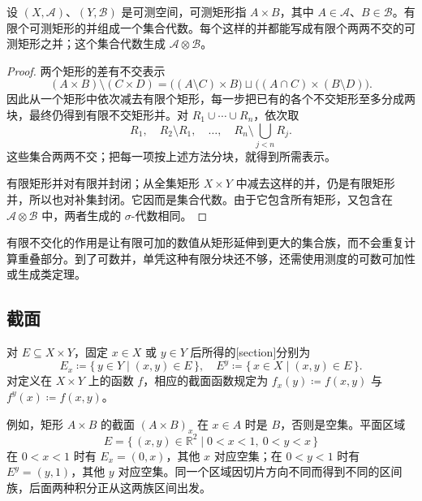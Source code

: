 \begin{lemma}\label{b1:lem:rectangle-algebra}
设 \((X,\mathcal A)\)、\((Y,\mathcal B)\) 是可测空间，可测矩形指 \(A\times B\)，其中 \(A\in\mathcal A\)、\(B\in\mathcal B\)。有限个可测矩形的并组成一个集合代数。每个这样的并都能写成有限个两两不交的可测矩形之并；这个集合代数生成 \(\mathcal A\otimes\mathcal B\)。
\end{lemma}
\begin{proof}
两个矩形的差有不交表示
\[
(A\times B)\setminus(C\times D)
=\bigl((A\setminus C)\times B\bigr)
\sqcup\bigl((A\cap C)\times(B\setminus D)\bigr).
\]
因此从一个矩形中依次减去有限个矩形，每一步把已有的各个不交矩形至多分成两块，最终仍得到有限不交矩形并。对 \(R_1\cup\cdots\cup R_n\)，依次取
\[
R_1,\quad R_2\setminus R_1,\quad\ldots,\quad
R_n\setminus\bigcup_{j<n}R_j.
\]
这些集合两两不交；把每一项按上述方法分块，就得到所需表示。

有限矩形并对有限并封闭；从全集矩形 \(X\times Y\) 中减去这样的并，仍是有限矩形并，所以也对补集封闭。它因而是集合代数。由于它包含所有矩形，又包含在 \(\mathcal A\otimes\mathcal B\) 中，两者生成的 \(\sigma\)-代数相同。
\end{proof}

有限不交化的作用是让有限可加的数值从矩形延伸到更大的集合族，而不会重复计算重叠部分。到了可数并，单凭这种有限分块还不够，还需使用测度的可数可加性或生成类定理。

\subsection{截面}
\label{b1:subsec:070103}

\begin{definition}\label{b1:def:product-sections}
对 \(E\subseteq X\times Y\)，固定 \(x\in X\) 或 \(y\in Y\) 后所得的[section]分别为
\[
E_x\coloneqq\{\,y\in Y\mid(x,y)\in E\,\},\quad
E^y\coloneqq\{\,x\in X\mid(x,y)\in E\,\}.
\]
对定义在 \(X\times Y\) 上的函数 \(f\)，相应的截面函数规定为 \(f_x(y)\coloneqq f(x,y)\) 与 \(f^y(x)\coloneqq f(x,y)\)。
\end{definition}

例如，矩形 \(A\times B\) 的截面 \((A\times B)_x\) 在 \(x\in A\) 时是 \(B\)，否则是空集。平面区域
\[
E=\{\,(x,y)\in\mathbb R^2\mid0<x<1,\ 0<y<x\,\}
\]
在 \(0<x<1\) 时有 \(E_x=(0,x)\)，其他 \(x\) 对应空集；在 \(0<y<1\) 时有 \(E^y=(y,1)\)，其他 \(y\) 对应空集。同一个区域因切片方向不同而得到不同的区间族，后面两种积分正从这两族区间出发。

